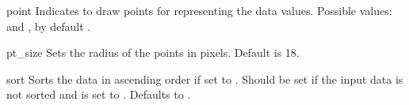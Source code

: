 \begin{AttrDecl}{point}
Indicates to draw points for representing the data values. Possible
values:  and , by default .
\end{AttrDecl}

\begin{AttrDecl}{pt\_size}
Sets the radius of the points in pixels. Default is 18.
\end{AttrDecl}

\begin{AttrDecl}{sort}
Sorts the data in ascending order if set to . Should be
set if the input data is not sorted and  is set to
. Defaults to .
\end{AttrDecl}
